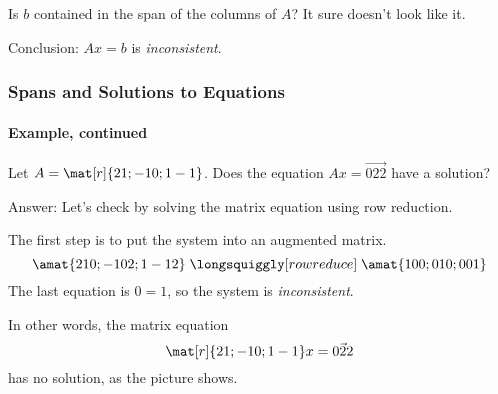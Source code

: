 \begin{frame}
\begin{center}
\end{center}

\pause[5]\smallskip%
Is $b$ contained in the span of the columns of $A$?
\pause
It sure doesn't look like it.

\pause\medskip
\alert{Conclusion:} $Ax=b$ is \emph{inconsistent}.

\end{frame}



\begin{frame}
\frametitle{Spans and Solutions to Equations}
\framesubtitle{Example, continued}

\vskip-3mm
\begin{ques}
  Let $A = \mat[r]{2 1; -1 0; 1 -1}$.
  Does the equation $Ax = \vec{0 2 2}$ have a solution?
\end{ques}

\medskip
\alert{Answer:}
Let's check by solving the matrix equation using row reduction.  

\begin{webonly}
\medskip
The first step is to put the system into an augmented matrix.
\[  \amat{2 1 0; -1 0 2; 1 -1 2}
\;\longsquiggly[row reduce]\;
  \amat{1 0 0; 0 1 0; 0 0 1} \]
The last equation is $0=1$, so the system is \emph{inconsistent}.
\end{webonly}

\pause\medskip
In other words, the matrix equation 
\[ \mat[r]{2 1; -1 0; 1 -1}x = \vec{0 2 2} \]
has no solution, as the picture shows.

\end{frame}



